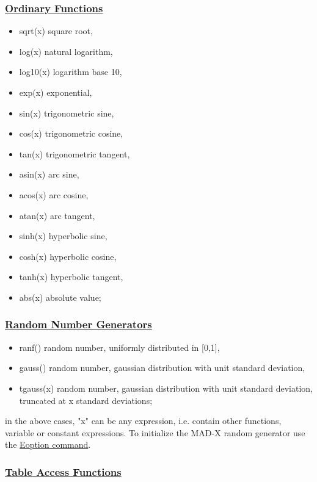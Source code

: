 \subsubsection{\href{function}{Ordinary Functions}}
\begin{itemize}
	\item sqrt(x) square root, 
	\item log(x) natural logarithm, 
	\item log10(x) logarithm base 10, 
	\item exp(x) exponential, 
	\item sin(x) trigonometric sine, 
	\item cos(x) trigonometric cosine, 
	\item tan(x) trigonometric tangent, 
	\item asin(x) arc sine, 
	\item acos(x) arc cosine, 
	\item atan(x) arc tangent, 
	\item sinh(x) hyperbolic sine, 
	\item cosh(x) hyperbolic cosine, 
	\item tanh(x) hyperbolic tangent, 
	\item abs(x) absolute value; 
\end{itemize}

\subsubsection{\href{random}{Random Number Generators}}
\begin{itemize}
	\item ranf() random number, uniformly distributed in [0,1], 
	\item gauss() random number, gaussian distribution with unit standard deviation, 
	\item tgauss(x) random number, gaussian distribution with unit standard deviation, truncated at x standard deviations; 
\end{itemize} 

in the above cases, "x" can be any expression, i.e. contain other
functions, variable or constant expressions. To initialize the MAD-X
random generator use the
\href{../error/error_option.html#EOPTION}{Eoption command}.  

\subsubsection{\href{table}{Table Access Functions}}

